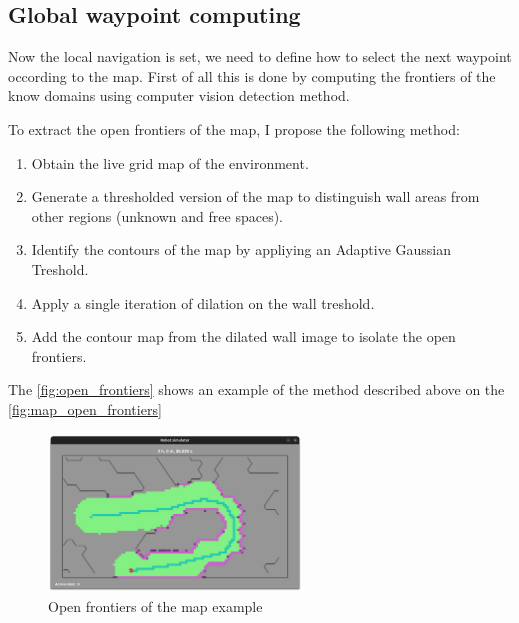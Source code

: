 \documentclass[../main.tex]{subfiles}
\begin{document}
\subsection{Global waypoint computing}

Now the local navigation is set, we need to define how to select the next waypoint occording to the map. First of all this is done by computing the frontiers of the know domains using computer vision detection method.


To extract the open frontiers of the map, I propose the following method:
\begin{enumerate}
	\item Obtain the live grid map of the environment.
	\item Generate a thresholded version of the map to distinguish wall areas from other regions (unknown and free spaces).
	\item Identify the contours of the map by appliying an Adaptive Gaussian Treshold.
	\item Apply a single iteration of dilation on the wall treshold.
	\item Add the contour map from the dilated wall image to isolate the open frontiers.
\end{enumerate}

The \autoref{fig:open_frontiers} shows an example of the method described above on the \autoref{fig:map_open_frontiers}

\begin{figure}[H]
	\centering
	\includegraphics[width=0.6\textwidth]{IMAGES/part3/map_open_frontiers.png}
	\caption{Open frontiers of the map example}
	\label{fig:map_open_frontiers}
\end{figure}
\end{document}
